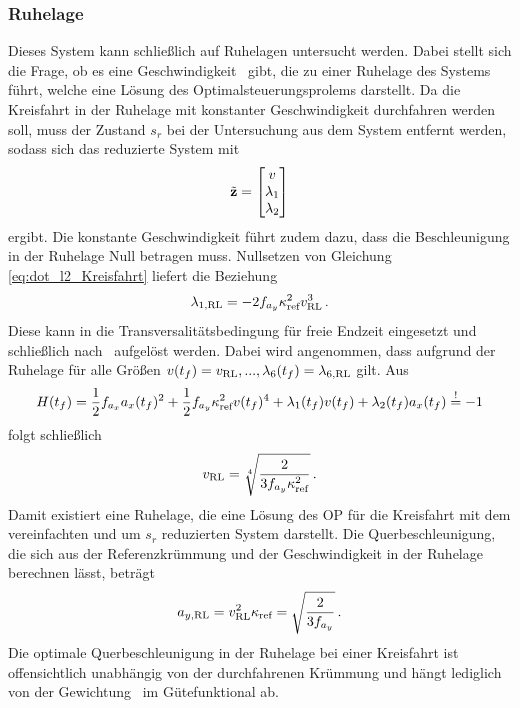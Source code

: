 \subsubsection{Ruhelage}\label{subsubsec:RL_ohne_Querdynamik}
Dieses System kann schließlich auf Ruhelagen untersucht werden. Dabei stellt sich die Frage, ob es eine Geschwindigkeit \vRL~gibt, die zu einer Ruhelage des Systems führt, welche eine Lösung des Optimalsteuerungsprolems darstellt. Da die Kreisfahrt in der Ruhelage mit konstanter Geschwindigkeit durchfahren werden soll, muss der Zustand $s_r$ bei der Untersuchung aus dem System entfernt werden, sodass sich das reduzierte System mit 
\begin{equation}
\tilde{\boldsymbol{\mathrm{z}}} = \begin{bmatrix}
v \\
\lambda_1 \\
\lambda_2
\end{bmatrix}
\end{equation}
ergibt. Die konstante Geschwindigkeit führt zudem dazu, dass die Beschleunigung in der Ruhelage Null betragen muss. Nullsetzen von Gleichung \eqref{eq:dot_l2_Kreisfahrt} liefert die Beziehung 
\begin{equation}
\lambda_{1,\textrm{RL}} = -2f_{a_y}\kappa_{\textrm{ref}}^2v_{\textrm{RL}}^3\,.
\end{equation}
Diese kann in die Transversalitätsbedingung für freie Endzeit eingesetzt und schließlich nach \vRL~aufgelöst werden. Dabei wird angenommen, dass aufgrund der Ruhelage für alle Größen $v(t_f) = v_{\textrm{RL}},...,\lambda_6(t_f) = \lambda_{6,\textrm{RL}}$ gilt. Aus 
\begin{equation}
H(t_f) = \frac{1}{2}f_{a_x} a_x(t_f)^2 + \frac{1}{2}f_{a_y} \kappa_{\textrm{ref}}^2v(t_f)^4 + \lambda_1(t_f)v(t_f) + \lambda_2(t_f)a_x(t_f) \stackrel{!}{=} -1 
\end{equation}
folgt schließlich
\begin{equation}
v_{\textrm{RL}} = \sqrt[4]{\frac{2}{3f_{a_y}\kappa_{\textrm{ref}}^2}} \,. \label{eq:v_RL_ohne_Qerdynamik}
\end{equation}
Damit existiert eine Ruhelage, die eine Lösung des \gls{OP} für die Kreisfahrt mit dem vereinfachten und um $s_r$ reduzierten System darstellt. Die Querbeschleunigung, die sich aus der Referenzkrümmung und der Geschwindigkeit in der Ruhelage berechnen lässt, beträgt
\begin{equation}
a_{y,\textrm{RL}} = v_{\textrm{RL}}^2\kappa_{\textrm{ref}} = \sqrt{\frac{2}{3f_{a_y}}} \,. \label{eq:ayRL_Kreisfahrt}
\end{equation}
Die optimale Querbeschleunigung in der Ruhelage bei einer Kreisfahrt ist offensichtlich unabhängig von der durchfahrenen Krümmung und hängt lediglich von der Gewichtung \fay~im Gütefunktional ab.
